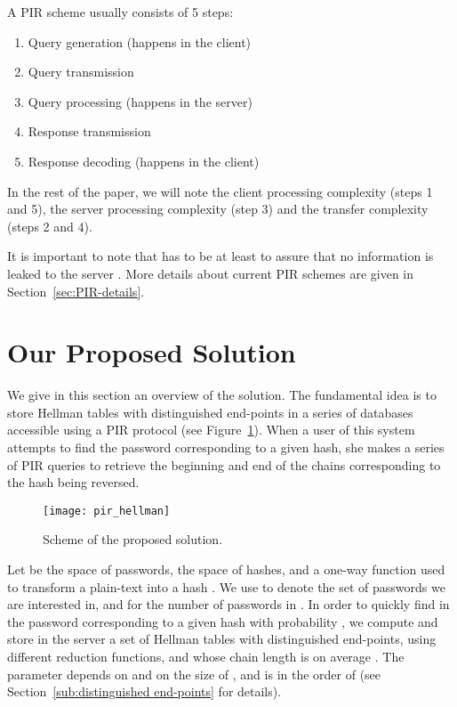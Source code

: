 \documentclass{llncs}
\begin{document}
A PIR scheme usually consists of 5 steps:
\begin{enumerate}
\item Query generation (happens in the client)
\item Query transmission
\item Query processing (happens in the server)
\item Response transmission
\item Response decoding (happens in the client)
\end{enumerate}

In the rest of the paper, we will note 
 the client processing complexity (steps 1 and 5), 
 the server processing complexity (step 3) and 
 the transfer complexity (steps 2 and 4). 

It is important to note that  has to be at least  
to assure that no information is leaked to the server \cite{paper:pir_survey}. 
More details about current PIR schemes are given in Section~\ref{sec:PIR-details}.






\section{Our Proposed Solution} \label{sec:solution}



We give in this section an overview of the solution.
The fundamental idea is to store Hellman tables with
distinguished end-points in a series of databases accessible using
a PIR protocol (see Figure~\ref{fig:scheme}). 
When a user of this system
attempts to find the password corresponding to a given hash, she makes a series of
PIR queries to retrieve the beginning and end of
the chains corresponding to the hash being reversed.

\begin{figure}[ht]
\centering
\texttt{[image: pir\_hellman]}
\caption{Scheme of the proposed solution.} \label{fig:scheme}
\end{figure}

Let  be the space of passwords,  the space of hashes,
and  a one-way function used to transform 
a plain-text  into a hash .
We use  to denote the set of passwords 
we are interested in,
and  for the number of passwords in . 
In order to quickly find in  the password corresponding to a given hash 
with probability , 
we compute and store in the server a set of  Hellman
tables with distinguished end-points, using  different reduction
functions, and whose chain length is on average .
The parameter  depends on  and on the size of ,
and is in the order of 
(see Section~\ref{sub:distinguished end-points} for details). 
\end{document}
